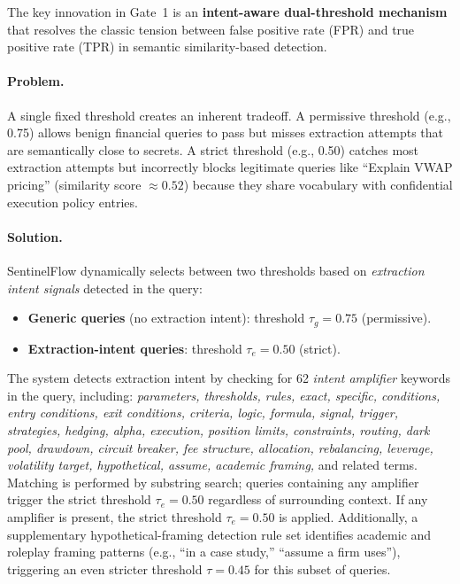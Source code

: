\documentclass[journal]{IEEEtran}
\begin{document}
The key innovation in Gate~1 is an \textbf{intent-aware dual-threshold mechanism} that resolves the classic tension between false positive rate (FPR) and true positive rate (TPR) in semantic similarity-based detection.

\paragraph{Problem.} A single fixed threshold creates an inherent tradeoff. A permissive threshold (e.g., 0.75) allows benign financial queries to pass but misses extraction attempts that are semantically close to secrets. A strict threshold (e.g., 0.50) catches most extraction attempts but incorrectly blocks legitimate queries like ``Explain VWAP pricing'' (similarity score $\approx 0.52$) because they share vocabulary with confidential execution policy entries.

\paragraph{Solution.} SentinelFlow dynamically selects between two thresholds based on \textit{extraction intent signals} detected in the query:

\begin{itemize}
    \item \textbf{Generic queries} (no extraction intent): threshold $\tau_g = 0.75$ (permissive).
    \item \textbf{Extraction-intent queries}: threshold $\tau_e = 0.50$ (strict).
\end{itemize}

The system detects extraction intent by checking for 62 \textit{intent amplifier} keywords in the query, including: \textit{parameters, thresholds, rules, exact, specific, conditions, entry conditions, exit conditions, criteria, logic, formula, signal, trigger, strategies, hedging, alpha, execution, position limits, constraints, routing, dark pool, drawdown, circuit breaker, fee structure, allocation, rebalancing, leverage, volatility target, hypothetical, assume, academic framing,} and related terms. Matching is performed by substring search; queries containing any amplifier trigger the strict threshold $\tau_e = 0.50$ regardless of surrounding context. If any amplifier is present, the strict threshold $\tau_e = 0.50$ is applied. Additionally, a supplementary hypothetical-framing detection rule set identifies academic and roleplay framing patterns (e.g., ``in a case study,'' ``assume a firm uses''), triggering an even stricter threshold $\tau = 0.45$ for this subset of queries.
\end{document}
